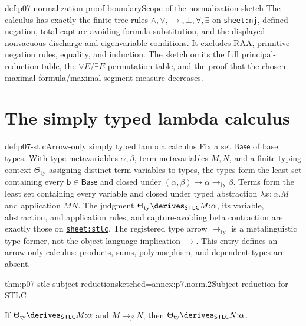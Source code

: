 \begin{proofboundary}{def:p07-normalization-proof-boundary}{Scope of the normalization sketch}
The calculus has exactly the finite-tree rules
\(\land,\lor,\to,\bot,\forall,\exists\) on \texttt{sheet:nj}, defined
negation, total capture-avoiding formula substitution, and the displayed
nonvacuous-discharge and eigenvariable conditions.  It excludes RAA,
primitive-negation rules, equality, and induction.  The sketch omits the full
principal-reduction table, the \(\lor E/\exists E\) permutation table, and
the proof that the chosen maximal-formula/maximal-segment measure decreases.
\end{proofboundary}

\section{The simply typed lambda calculus}

\begin{hbdefinition}{def:p07-stlc}{Arrow-only simply typed lambda calculus}
Fix a set \(\mathsf{Base}\) of base types.  With type metavariables
\(\alpha,\beta\), term metavariables \(M,N\), and a finite typing context
\(\Theta_{\mathrm{ty}}\) assigning distinct term variables to types, the
types form the least set containing every \(\mathsf b\in\mathsf{Base}\) and
closed under \((\alpha,\beta)\mapsto
\alpha\mathbin{\to_{\mathrm{ty}}}\beta\).  Terms form the least set containing
every variable and closed under typed abstraction
\(\lambda x{:}\alpha.M\) and application \(MN\).
The judgment
\(\Theta_{\mathrm{ty}}\derives_{\mathsf{STLC}}M{:}\alpha\), its variable,
abstraction, and application rules, and capture-avoiding beta contraction are
exactly those on \hyperref[sheet:stlc]{\texttt{sheet:stlc}}.  The registered
type arrow \(\to_{\mathrm{ty}}\) is a metalinguistic type former, not the
object-language implication \(\to\).  This entry defines an arrow-only
calculus: products, sums, polymorphism, and dependent types are absent.
\end{hbdefinition}

\begin{hbtheorem}{thm:p07-stlc-subject-reduction}{sketched=annex:p7.norm.2}{Subject reduction for STLC}
\par\noindent
If \(\Theta_{\mathrm{ty}}\derives_{\mathsf{STLC}}M{:}\alpha\) and
\(M\longrightarrow_\beta N\), then
\(\Theta_{\mathrm{ty}}\derives_{\mathsf{STLC}}N{:}\alpha\).
\end{hbtheorem}

